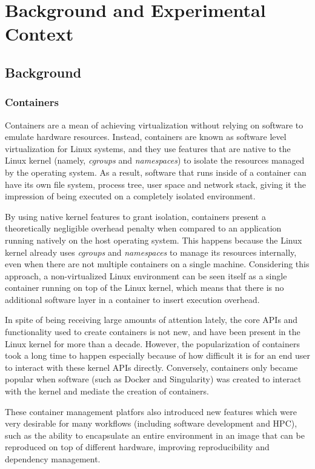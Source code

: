 \documentclass[12pt]{article}
\begin{document}
\section{Background and Experimental Context}
\subsection{Background}
\subsubsection{Containers}
Containers are a mean of achieving virtualization without relying on software to emulate hardware resources. Instead, containers are known as software level virtualization for Linux systems, and they use features that are native to the Linux kernel (namely, \textit{cgroups} and \textit{namespaces}) to isolate the resources managed by the operating system. As a result, software that runs inside of a container can have its own file system, process tree, user space and network stack, giving it the impression of being executed on a completely isolated environment.

By using native kernel features to grant isolation, containers present a theoretically negligible overhead penalty when compared to an application running natively on the host operating system. This happens because the Linux kernel already uses \textit{cgroups} and \textit{namespaces} to manage its resources internally, even when there are not multiple containers on a single machine. Considering this approach, a non-virtualized Linux environment can be seen itself as a single container running on top of the Linux kernel, which means that there is no additional software layer in a container to insert execution overhead.

In spite of being receiving large amounts of attention lately, the core APIs and functionality used to create containers is not new, and have been present in the Linux kernel for more than a decade. However, the popularization of containers took a long time to happen especially because of how difficult it is for an end user to interact with these kernel APIs directly. Conversely, containers only became popular when software (such as Docker and Singularity) was created to interact with the kernel and mediate the creation of containers. 

These container management platfors also introduced new features which were very desirable for many workflows (including software development and HPC), such as the ability to encapsulate an entire environment in an image that can be reproduced on top of different hardware, improving reproducibility and dependency management.
\end{document}
